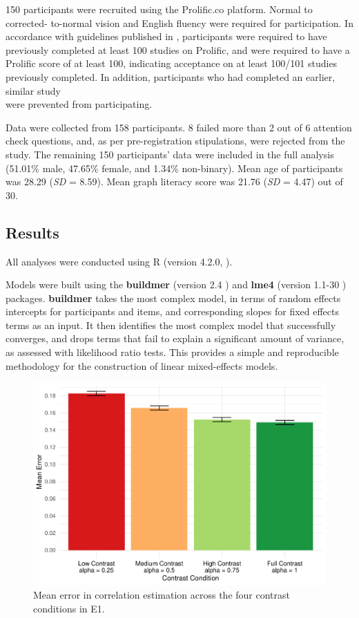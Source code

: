 \documentclass[preprint, 3p,
authoryear]{elsarticle} %
\begin{document}
150 participants were recruited using the Prolific.co platform. Normal
to corrected- to-normal vision and English fluency were required for
participation. In accordance with guidelines published in
\citep{peer_2021}, participants were required to have previously
completed at least 100 studies on Prolific, and were required to have a
Prolific score of at least 100, indicating acceptance on at least
100/101 studies previously completed. In addition, participants who had
completed an earlier, similar study\\
were prevented from participating.

Data were collected from 158 participants. 8 failed more than 2 out of 6
attention check questions, and, as per pre-registration stipulations,
were rejected from the study. The remaining 150 participants' data were
included in the full analysis (51.01\% male, 47.65\% female, and 1.34\%
non-binary). Mean age of participants was 28.29 (\emph{SD} = 8.59). Mean
graph literacy score was 21.76 (\emph{SD} = 4.47) out of 30.

\hypertarget{results}{%
\subsection{Results}\label{results}}

All analyses were conducted using R (version 4.2.0, \citep{r_core}).

Models were built using the \textbf{buildmer} (version 2.4
\citep{voeten_buildmer_2022}) and \textbf{lme4} (version 1.1-30
\citep{bates_lme4_2015}) packages. \textbf{buildmer} takes the most
complex model, in terms of random effects intercepts for participants
and items, and corresponding slopes for fixed effects terms
\citep{barr_random_2013} as an input. It then identifies the most
complex model that successfully converges, and drops terms that fail to
explain a significant amount of variance, as assessed with likelihood
ratio tests. This provides a simple and reproducible methodology for the
construction of linear mixed-effects models.

\begin{figure}

\includegraphics[width=0.5\linewidth]{contrast_and_scatterplots_files/figure-latex/e1-bar-plot-1} \hfill{}

\caption{\label{e1-bar-plot}Mean error in correlation estimation across the four contrast conditions in E1.}\label{fig:e1-bar-plot}
\end{figure}
\end{document}
